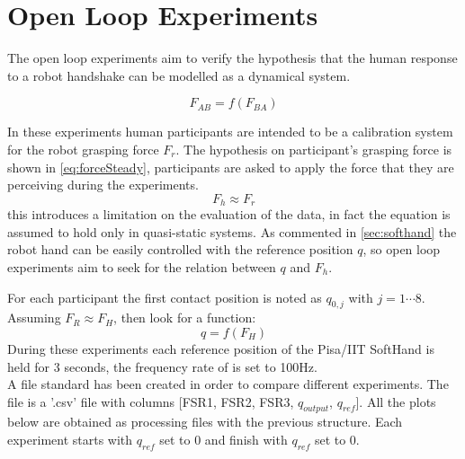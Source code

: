 \chapter{Open Loop Experiments}\label{ch:openloop}

The open loop experiments aim to verify the hypothesis that the human response to a robot handshake can be modelled as a dynamical system. 

\begin{equation}
F_{AB} = f(F_{BA})
\label{eq:closehypothesis}
\end{equation}

 In these experiments human participants are intended to be a calibration system for the robot grasping force $F_{r}$. The hypothesis on participant's grasping force is shown in \eqref{eq:forceSteady}, participants are asked to apply the force that they are perceiving during the experiments.
%
\begin{equation}
F_{h} \approx F_{r}
\label{eq:forceSteady}
\end{equation}
%
this introduces a limitation on the evaluation of the data, in fact the equation is assumed to hold only in quasi-static systems. As commented in \ref{sec:softhand} the robot hand can be easily controlled with the reference position $q$, so open loop experiments aim to seek for the relation between $q$ and $F_{h}$. %

For each participant the first contact position is noted as $q_{0,j}$ with $j=1\cdots 8$. Assuming $F_R \approx F_H$, then look for a function:
\begin{equation}
q=f(F_{H})
\label{eq:q_Fh}
\end{equation}
%
During these experiments each reference position of the Pisa/IIT SoftHand is held for 3 seconds, the frequency rate of is set to 100Hz. \\
A file standard has been created in order to compare different experiments. The file is a '.csv' file with columns [FSR1, FSR2, FSR3, $q_{output}$, $q_{ref}$]. All the plots below are obtained as processing files with the previous structure. Each experiment starts with $q_{ref}$ set to 0 and finish with $q_{ref}$ set to 0. \\
